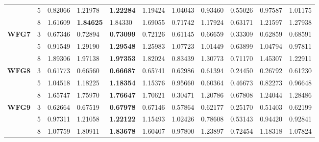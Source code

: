 \documentclass[conference]{IEEEtran}
\begin{document}
\begin{table*}[!htb]
\begin{tabular}{|l|l|l|l|l|l|l|l|l|l|l|}
	\textbf{}        & 5          & 0.82066          & 1.21978           & \textbf{1.22284}      & 1.19424          & 1.04043             & 0.93460             & 0.55026            & 0.97587              & 1.01175          \\ \cline{2-11} 
	\textbf{}        & 8          & 1.61609          & \textbf{1.84625}  & 1.84330               & 1.69055          & 0.71742             & 1.17924             & 0.63171            & 1.21597              & 1.27938          \\ \hline
	\textbf{WFG7}    & 3          & 0.67346          & 0.72894           & \textbf{0.73099}      & 0.72126          & 0.61145             & 0.66659             & 0.33309            & 0.62859              & 0.68591          \\ \cline{2-11} 
	\textbf{}        & 5          & 0.91549          & 1.29190           & \textbf{1.29548}      & 1.25983          & 1.07723             & 1.01449             & 0.63899            & 1.04794              & 0.97811          \\ \cline{2-11} 
	\textbf{}        & 8          & 1.89306          & 1.97138           & \textbf{1.97353}      & 1.82024          & 0.83439             & 1.30773             & 0.71170            & 1.45307              & 1.22911          \\ \hline
	\textbf{WFG8}    & 3          & 0.61773          & 0.66560           & \textbf{0.66687}      & 0.65741          & 0.62986             & 0.61394             & 0.24450            & 0.26792              & 0.61230          \\ \cline{2-11} 
	\textbf{}        & 5          & 1.04518          & 1.18225           & \textbf{1.18354}      & 1.15376          & 0.95660             & 0.60364             & 0.46673            & 0.82273              & 0.96648          \\ \cline{2-11} 
	\textbf{}        & 8          & 1.65747          & 1.75970           & \textbf{1.76647}      & 1.70621          & 0.30471             & 1.20786             & 0.67808            & 1.24044              & 1.28486          \\ \hline
	\textbf{WFG9}    & 3          & 0.62664          & 0.67519           & \textbf{0.67978}      & 0.67146          & 0.57864             & 0.62177             & 0.25170            & 0.51403              & 0.62199          \\ \cline{2-11} 
	\textbf{}        & 5          & 0.97311          & 1.21058           & \textbf{1.22122}      & 1.15493          & 1.02426             & 0.78608             & 0.53143            & 0.94420              & 0.92841          \\ \cline{2-11} 
	\textbf{}        & 8          & 1.07759          & 1.80911           & \textbf{1.83678}      & 1.60407          & 0.97800             & 1.23897             & 0.72454            & 1.18318              & 1.07824          \\ \hline
\end{tabular}
\end{table*}
\end{document}

